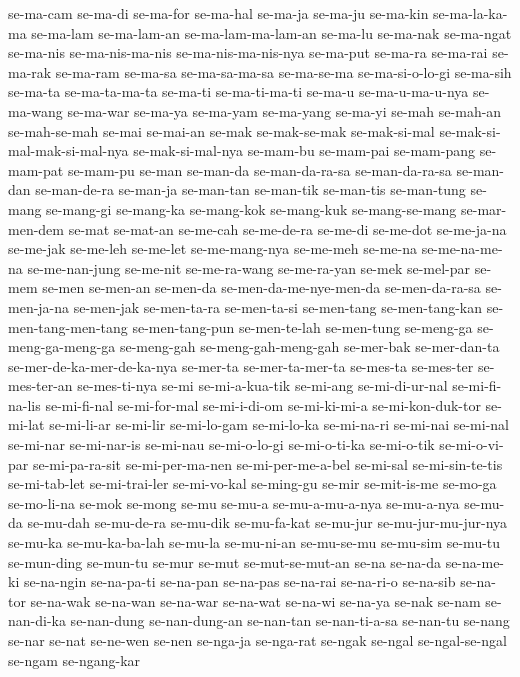 {se-ma-cam se-ma-di se-ma-for se-ma-hal se-ma-ja se-ma-ju se-ma-kin
se-ma-la-ka-ma se-ma-lam se-ma-lam-an se-ma-lam-ma-lam-an se-ma-lu
se-ma-nak se-ma-ngat se-ma-nis se-ma-nis-ma-nis se-ma-nis-ma-nis-nya
se-ma-put se-ma-ra se-ma-rai se-ma-rak se-ma-ram se-ma-sa se-ma-sa-ma-sa
se-ma-se-ma se-ma-si-o-lo-gi se-ma-sih se-ma-ta se-ma-ta-ma-ta se-ma-ti
se-ma-ti-ma-ti se-ma-u se-ma-u-ma-u-nya se-ma-wang se-ma-war se-ma-ya
se-ma-yam se-ma-yang se-ma-yi se-mah se-mah-an se-mah-se-mah se-mai
se-mai-an se-mak se-mak-se-mak se-mak-si-mal se-mak-si-mal-mak-si-mal-nya
se-mak-si-mal-nya se-mam-bu se-mam-pai se-mam-pang se-mam-pat se-mam-pu
se-man se-man-da se-man-da-ra-sa se-man-da-ra-sa se-man-dan se-man-de-ra
se-man-ja se-man-tan se-man-tik se-man-tis se-man-tung se-mang se-mang-gi
se-mang-ka se-mang-kok se-mang-kuk se-mang-se-mang se-mar-men-dem se-mat
se-mat-an se-me-cah se-me-de-ra se-me-di se-me-dot se-me-ja-na se-me-jak
se-me-leh se-me-let se-me-mang-nya se-me-meh se-me-na se-me-na-me-na
se-me-nan-jung se-me-nit se-me-ra-wang se-me-ra-yan se-mek se-mel-par
se-mem se-men se-men-an se-men-da se-men-da-me-nye-men-da se-men-da-ra-sa
se-men-ja-na se-men-jak se-men-ta-ra se-men-ta-si se-men-tang
se-men-tang-kan se-men-tang-men-tang se-men-tang-pun se-men-te-lah
se-men-tung se-meng-ga se-meng-ga-meng-ga se-meng-gah se-meng-gah-meng-gah
se-mer-bak se-mer-dan-ta se-mer-de-ka-mer-de-ka-nya se-mer-ta
se-mer-ta-mer-ta se-mes-ta se-mes-ter se-mes-ter-an se-mes-ti-nya se-mi
se-mi-a-kua-tik se-mi-ang se-mi-di-ur-nal se-mi-fi-na-lis se-mi-fi-nal
se-mi-for-mal se-mi-i-di-om se-mi-ki-mi-a se-mi-kon-duk-tor se-mi-lat
se-mi-li-ar se-mi-lir se-mi-lo-gam se-mi-lo-ka se-mi-na-ri se-mi-nai
se-mi-nal se-mi-nar se-mi-nar-is se-mi-nau se-mi-o-lo-gi se-mi-o-ti-ka
se-mi-o-tik se-mi-o-vi-par se-mi-pa-ra-sit se-mi-per-ma-nen
se-mi-per-me-a-bel se-mi-sal se-mi-sin-te-tis se-mi-tab-let se-mi-trai-ler
se-mi-vo-kal se-ming-gu se-mir se-mit-is-me se-mo-ga se-mo-li-na se-mok
se-mong se-mu se-mu-a se-mu-a-mu-a-nya se-mu-a-nya se-mu-da se-mu-dah
se-mu-de-ra se-mu-dik se-mu-fa-kat se-mu-jur se-mu-jur-mu-jur-nya se-mu-ka
se-mu-ka-ba-lah se-mu-la se-mu-ni-an se-mu-se-mu se-mu-sim se-mu-tu
se-mun-ding se-mun-tu se-mur se-mut se-mut-se-mut-an se-na se-na-da
se-na-me-ki se-na-ngin se-na-pa-ti se-na-pan se-na-pas se-na-rai
se-na-ri-o se-na-sib se-na-tor se-na-wak se-na-wan se-na-war se-na-wat
se-na-wi se-na-ya se-nak se-nam se-nan-di-ka se-nan-dung se-nan-dung-an
se-nan-tan se-nan-ti-a-sa se-nan-tu se-nang se-nar se-nat se-ne-wen se-nen
se-nga-ja se-nga-rat se-ngak se-ngal se-ngal-se-ngal se-ngam se-ngang-kar
}
